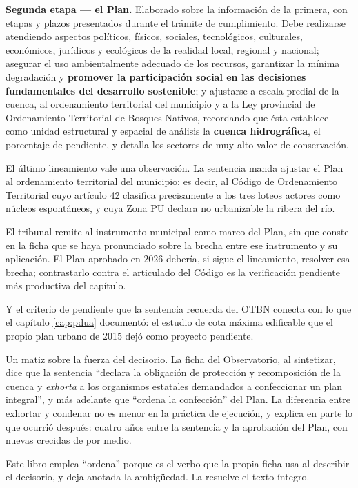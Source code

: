 \textbf{Segunda etapa --- el Plan.} Elaborado sobre la información de la primera, con etapas y plazos presentados durante el trámite de cumplimiento. Debe realizarse atendiendo aspectos políticos, físicos, sociales, tecnológicos, culturales, económicos, jurídicos y ecológicos de la realidad local, regional y nacional; asegurar el uso ambientalmente adecuado de los recursos, garantizar la mínima degradación y \textbf{promover la participación social en las decisiones fundamentales del desarrollo sostenible}; y ajustarse a escala predial de la cuenca, al ordenamiento territorial del municipio y a la Ley provincial de Ordenamiento Territorial de Bosques Nativos, recordando que ésta establece como unidad estructural y espacial de análisis la \textbf{cuenca hidrográfica}, el porcentaje de pendiente, y detalla los sectores de muy alto valor de conservación.

El último lineamiento vale una observación. La sentencia manda ajustar el Plan al ordenamiento territorial del municipio: es decir, al Código de Ordenamiento Territorial cuyo artículo 42 clasifica precisamente a los tres loteos actores como núcleos espontáneos, y cuya Zona PU declara no urbanizable la ribera del río.

El tribunal remite al instrumento municipal como marco del Plan, sin que conste en la ficha que se haya pronunciado sobre la brecha entre ese instrumento y su aplicación. El Plan aprobado en 2026 debería, si sigue el lineamiento, resolver esa brecha; contrastarlo contra el articulado del Código es la verificación pendiente más productiva del capítulo.

Y el criterio de pendiente que la sentencia recuerda del OTBN conecta con lo que el capítulo \ref{cap:pdua} documentó: el estudio de cota máxima edificable que el propio plan urbano de 2015 dejó como proyecto pendiente.

Un matiz sobre la fuerza del decisorio. La ficha del Observatorio, al sintetizar, dice que la sentencia ``declara la obligación de protección y recomposición de la cuenca y \textit{exhorta} a los organismos estatales demandados a confeccionar un plan integral'', y más adelante que ``ordena la confección'' del Plan. La diferencia entre exhortar y condenar no es menor en la práctica de ejecución, y explica en parte lo que ocurrió después: cuatro años entre la sentencia y la aprobación del Plan, con nuevas crecidas de por medio.

Este libro emplea ``ordena'' porque es el verbo que la propia ficha usa al describir el decisorio, y deja anotada la ambigüedad. La resuelve el texto íntegro.


